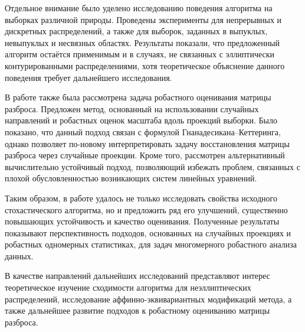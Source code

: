 Отдельное внимание было уделено исследованию поведения алгоритма на выборках различной природы. Проведены эксперименты для непрерывных и дискретных распределений, а также для выборок, заданных в выпуклых, невыпуклых и несвязных областях. Результаты показали, что предложенный алгоритм остаётся применимым и в случаях, не связанных с эллиптически контурированными распределениями, хотя теоретическое объяснение данного поведения требует дальнейшего исследования.

В работе также была рассмотрена задача робастного оценивания матрицы разброса. Предложен метод, основанный на использовании случайных направлений и робастных оценок масштаба вдоль проекций выборки. Было показано, что данный подход связан с формулой Гнанадесикана--Кеттеринга, однако позволяет по-новому интерпретировать задачу восстановления матрицы разброса через случайные проекции. Кроме того, рассмотрен альтернативный вычислительно устойчивый подход, позволяющий избежать проблем, связанных с плохой обусловленностью возникающих систем линейных уравнений.

Таким образом, в работе удалось не только исследовать свойства исходного стохастического алгоритма, но и предложить ряд его улучшений, существенно повышающих устойчивость и качество оценивания. Полученные результаты показывают перспективность подходов, основанных на случайных проекциях и робастных одномерных статистиках, для задач многомерного робастного анализа данных.

В качестве направлений дальнейших исследований представляют интерес теоретическое изучение сходимости алгоритма для неэллиптических распределений, исследование аффинно-эквивариантных модификаций метода, а также дальнейшее развитие подходов к робастному оцениванию матрицы разброса.





